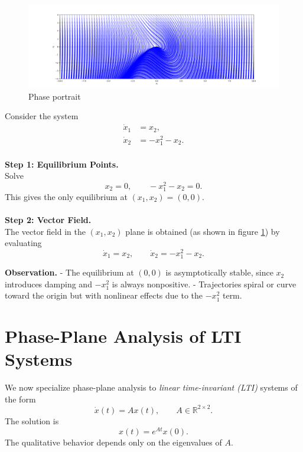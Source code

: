\begin{example}
\begin{figure}[h!]
    \centering
    \includegraphics[width=\linewidth]{Images/nonlinear/introduction/phase.png}
    \caption{Phase portrait}
    \label{fig:phase}
\end{figure}
Consider the system
\begin{align}
    \dot{x}_1 &= x_2, \\
    \dot{x}_2 &= -x_1^2 - x_2.
\end{align}
\\
\textbf{Step 1: Equilibrium Points.}  
\\Solve
\[
x_2 = 0, \qquad -x_1^2 - x_2 = 0.
\]
This gives the only equilibrium at $(x_1, x_2) = (0,0)$.
\\\\
\textbf{Step 2: Vector Field.}  
\\The vector field in the $(x_1,x_2)$ plane is obtained (as shown in figure \ref{fig:phase}) by evaluating
\[
\dot{x}_1 = x_2, \qquad \dot{x}_2 = -x_1^2 - x_2.
\]


\textbf{Observation.}  
- The equilibrium at $(0,0)$ is asymptotically stable, since $x_2$ introduces damping and $-x_1^2$ is always nonpositive.  
- Trajectories spiral or curve toward the origin but with nonlinear effects due to the $-x_1^2$ term.
\end{example}

\section{Phase-Plane Analysis of LTI Systems}

We now specialize phase-plane analysis to \emph{linear time-invariant (LTI)} systems of the form
\begin{equation}
    \dot{x}(t) = A x(t), \qquad A \in \mathbb{R}^{2\times 2}.
\end{equation}
The solution is
\begin{equation}
    x(t) = e^{At} x(0).
\end{equation}
The qualitative behavior depends only on the eigenvalues of $A$.  

